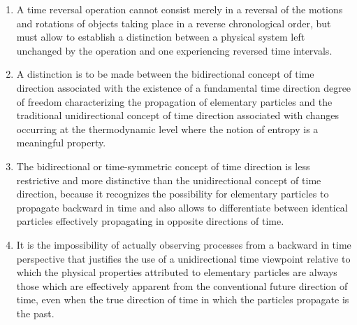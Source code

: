 \documentclass[notitlepage,12pt]{report}
\begin{document}
\begin{enumerate}
\item A time reversal operation cannot consist merely in a reversal of the motions and rotations of objects taking place in a reverse chronological order, but must allow to establish a distinction between a physical system left unchanged by the operation and one experiencing reversed time intervals.

\item A distinction is to be made between the bidirectional concept of time direction associated with the existence of a fundamental time direction degree of freedom characterizing the propagation of elementary particles and the traditional unidirectional concept of time direction associated with changes occurring at the thermodynamic level where the notion of entropy is a meaningful property.

\item The bidirectional or time-symmetric concept of time direction is less restrictive and more distinctive than the unidirectional concept of time direction, because it recognizes the possibility for elementary particles to propagate backward in time and also allows to differentiate between identical particles effectively propagating in opposite directions of time.

\item It is the impossibility of actually observing processes from a backward in time perspective that justifies the use of a unidirectional time viewpoint relative to which the physical properties attributed to elementary particles are always those which are effectively apparent from the conventional future direction of time, even when the true direction of time in which the particles propagate is the past.


\end{enumerate}
\end{document}
